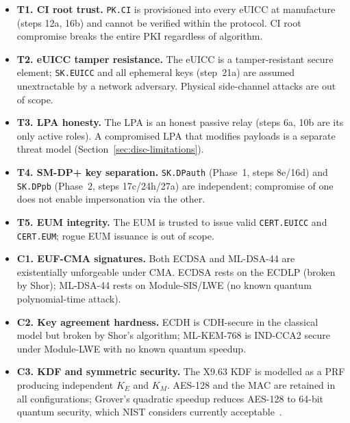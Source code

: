 \documentclass[a4paper,fleqn]{cas-sc}
\begin{document}
\begin{itemize}[leftmargin=*, noitemsep, topsep=4pt]

  \item \textbf{T1. CI root trust.} \texttt{PK.CI} is provisioned into
  every eUICC at manufacture (steps 12a, 16b) and cannot be verified
  within the protocol. CI root compromise breaks the entire PKI
  regardless of algorithm.

  \item \textbf{T2. eUICC tamper resistance.} The eUICC is a
  tamper-resistant secure element; \texttt{SK.EUICC} and all ephemeral
  keys (step~21a) are assumed unextractable by a network adversary.
  Physical side-channel attacks are out of scope.

  \item \textbf{T3. LPA honesty.} The LPA is an honest passive relay
  (steps 6a, 10b are its only active roles). A compromised LPA that
  modifies payloads is a separate threat model (Section~\ref{sec:disc-limitations}).

  \item \textbf{T4. SM-DP+ key separation.} \texttt{SK.DPauth}
  (Phase~1, steps 8e/16d) and \texttt{SK.DPpb} (Phase~2,
  steps 17c/24h/27a) are independent; compromise of one does not
  enable impersonation via the other.

  \item \textbf{T5. EUM integrity.} The EUM is trusted to issue valid
  \texttt{CERT.EUICC} and \texttt{CERT.EUM}; rogue EUM issuance is
  out of scope.

  \item \textbf{C1. EUF-CMA signatures.} Both ECDSA and ML-DSA-44 are
  existentially unforgeable under CMA. ECDSA rests on the ECDLP
  (broken by Shor); ML-DSA-44 rests on Module-SIS/LWE (no known
  quantum polynomial-time attack).

  \item \textbf{C2. Key agreement hardness.} ECDH is CDH-secure in the
  classical model but broken by Shor's algorithm; ML-KEM-768 is
  IND-CCA2 secure under Module-LWE with no known quantum speedup.

  \item \textbf{C3. KDF and symmetric security.} The X9.63 KDF is
  modelled as a PRF producing independent $K_E$ and $K_M$. AES-128
  and the MAC are retained in all configurations; Grover's quadratic
  speedup reduces AES-128 to 64-bit quantum security, which NIST
  considers currently acceptable~\cite{nist2024pqc}.


\end{itemize}
\end{document}
